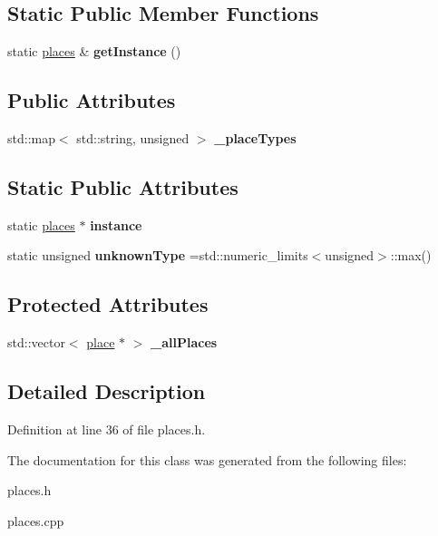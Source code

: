 \subsection*{Static Public Member Functions}
\begin{DoxyCompactItemize}
\item 
\mbox{\label{classplaces_acb5dbcd8606a8a1ffbebc9fb5a3c8a5e}} 
static \mbox{\hyperlink{classplaces}{places}} \& {\bfseries get\+Instance} ()
\end{DoxyCompactItemize}
\subsection*{Public Attributes}
\begin{DoxyCompactItemize}
\item 
\mbox{\label{classplaces_a7d5529185ae4635d2e2048b4ae475c12}} 
std\+::map$<$ std\+::string, unsigned $>$ {\bfseries \+\_\+place\+Types}
\end{DoxyCompactItemize}
\subsection*{Static Public Attributes}
\begin{DoxyCompactItemize}
\item 
\mbox{\label{classplaces_acac17c038967becf0ccaffbcc88e35fa}} 
static \mbox{\hyperlink{classplaces}{places}} $\ast$ {\bfseries instance}
\item 
\mbox{\label{classplaces_ab03feda32ddd4784c17de8b2185b3563}} 
static unsigned {\bfseries unknown\+Type} =std\+::numeric\+\_\+limits$<$unsigned$>$\+::max()
\end{DoxyCompactItemize}
\subsection*{Protected Attributes}
\begin{DoxyCompactItemize}
\item 
\mbox{\label{classplaces_a2cb6b12513a2245fd06b567490229d89}} 
std\+::vector$<$ \mbox{\hyperlink{classplace}{place}} $\ast$ $>$ {\bfseries \+\_\+all\+Places}
\end{DoxyCompactItemize}


\subsection{Detailed Description}


Definition at line 36 of file places.\+h.



The documentation for this class was generated from the following files\+:\begin{DoxyCompactItemize}
\item 
places.\+h\item 
places.\+cpp\end{DoxyCompactItemize}
